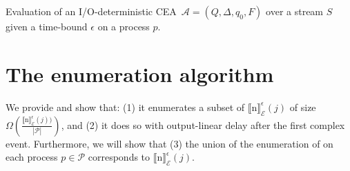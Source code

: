 \begin{algorithm}[H]
  \DontPrintSemicolon
  \SetAlgoNoEnd %
  \SetAlgoNoLine %
  \;
  \;
  \;
\caption{Evaluation of an I/O-deterministic \mbox{CEA ${\mathcal{A} = (Q, \Delta, q_{0}, F)}$} over a stream $S$ given a time-bound $\epsilon$ on a process $p$.}
\label{algo:update}
\end{algorithm}


\section{The enumeration algorithm}\label{sec:enumeration}

We provide  and show that: (1) it enumerates a subset of ${\llbracket \text{n} \rrbracket}^{\epsilon}_{\mathcal{E}}(j)$ of size $\Omega(\frac{{\llbracket \text{n} \rrbracket}^{\epsilon}_{\mathcal{E}}(j))}{|\mathcal{P}|})$, and (2) it does so with output-linear delay after the first complex event. Furthermore, we will show that (3) the union of the enumeration of  on each process $p \in \mathcal{P}$ corresponds to ${\llbracket \text{n} \rrbracket}^{\epsilon}_{\mathcal{E}}(j)$.

